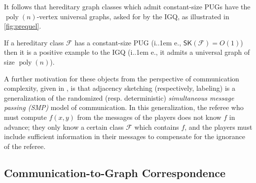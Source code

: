\documentclass{article}
\makeatletter
\DeclareMathOperator{\poly}{poly}
\newcommand{\cF}{\ensuremath{\mathcal{F}}}
\newcommand*\ie{i.\kern.1em e.\@\xspace} %
\newcommand{\RL}{\mathsf{SK}}
\makeatother
\begin{document}
It follows that hereditary graph classes which admit constant-size PUGs have the $\poly(n)$-vertex
universal graphs, asked for by the IGQ, as illustrated in \cref{fig:prequel}. 

\begin{proposition}
\label{prop:correspondence inclusion}
If a hereditary class $\cF$ has a constant-size PUG (\ie, $\RL(\cF)=O(1)$) then it is a positive example to the IGQ
(\ie, it admits a universal graph of size $\poly(n)$).
\end{proposition}

\begin{remark}
A further motivation for these objects from the perspective of communication complexity, given in
\cite{Har20}, is that adjacency sketching (respectively, labeling) is a generalization of the
randomized (resp. deterministic) \emph{simultaneous message passing (SMP)} model of communication.
In this generalization, the referee who must compute $f(x,y)$ from the messages of the players does
not know $f$ in advance; they only know a certain class $\cF$ which contains $f$, and the players
must include sufficient information in their messages to compensate for the ignorance of the
referee. 
\end{remark}

\subsection{Communication-to-Graph Correspondence}
\label{section:correspondence}
\end{document}
